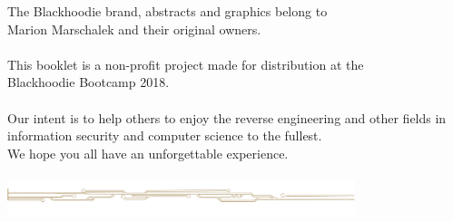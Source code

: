 \def\pagetitletext{}

\thispagestyle{empty}

\vspace*{\fill}
\begin{center}\footnotesize
The Blackhoodie brand, abstracts and graphics belong to\\Marion Marschalek and their original owners.\\
~\\
This booklet is a non-profit project made for distribution at the\\Blackhoodie Bootcamp 2018.\\
~\\
Our intent is to help others to enjoy the reverse engineering and other fields in information security and computer science to the fullest.\\We hope you all have an unforgettable experience.\\
~\\
\includegraphics[height=10mm,keepaspectratio]{images/blackhoodie_div.pdf}
\end{center}

